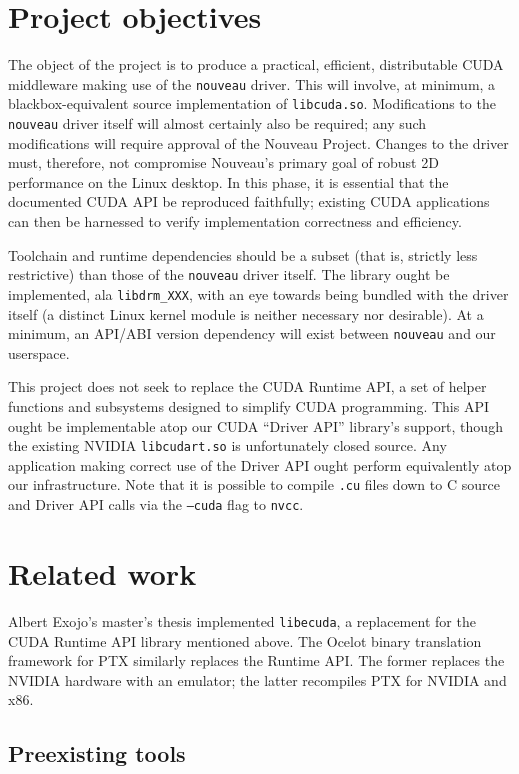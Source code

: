 \documentclass[letterpaper,10pt]{article}
\begin{document}
\begin{multicols}{2}
\section{Project objectives}
The object of the project is to produce a practical, efficient, distributable
CUDA middleware making use of the \texttt{nouveau} driver. This will involve,
at minimum, a blackbox-equivalent source implementation of \texttt{libcuda.so}.
Modifications to the \texttt{nouveau} driver itself will almost certainly also
be required; any such modifications will require approval of the Nouveau Project.
Changes to the driver must, therefore, not compromise Nouveau's primary goal of
robust 2D performance on the Linux desktop. In this phase, it is essential that
the documented CUDA API be reproduced faithfully; existing CUDA applications can
then be harnessed to verify implementation correctness and efficiency.

Toolchain and runtime dependencies should be a subset (that is, strictly less
restrictive) than those of the \texttt{nouveau} driver itself. The library
ought be implemented, ala \texttt{libdrm\_XXX}, with an eye towards being bundled
with the driver itself (a distinct Linux kernel module is neither necessary nor
desirable). At a minimum, an API/ABI version dependency will exist between
\texttt{nouveau} and our userspace.

This project does not seek to replace the CUDA Runtime API, a set of helper
functions and subsystems designed to simplify CUDA programming. This API ought
be implementable atop our CUDA ``Driver API'' library's support, though the
existing NVIDIA \texttt{libcudart.so} is unfortunately closed source. Any
application making correct use of the Driver API ought perform equivalently atop
our infrastructure. Note that it is possible to compile \texttt{.cu} files down
to C source and Driver API calls via the \texttt{--cuda} flag to \texttt{nvcc}\cite{nvcc}.
\section{Related work}
Albert Exojo's master's thesis implemented \texttt{libecuda}\cite{exojo}, a replacement for
the CUDA Runtime API library mentioned above. The Ocelot\cite{ocelot} binary translation
framework for PTX similarly replaces the Runtime API. The former replaces the NVIDIA
hardware with an emulator; the latter recompiles PTX for NVIDIA and x86.
\subsection{Preexisting tools}


\end{multicols}
\end{document}
